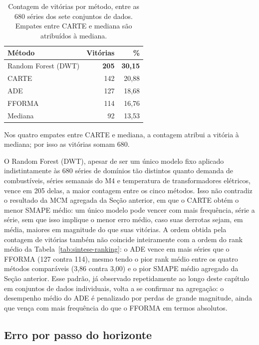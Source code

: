 \begin{table}[H]
\centering
\caption[Contagem de vitórias por método.]{Contagem de vitórias por método, entre as 680 séries dos sete conjuntos de dados. Empates entre CARTE e mediana são atribuídos à mediana.}
\label{tab:sintese-vitorias}
\begin{tabular}{@{}lrr@{}}
\toprule
\textbf{Método} & \textbf{Vitórias} & \textbf{\%} \\
\midrule
Random Forest (DWT) & \textbf{205} & \textbf{30,15} \\
CARTE               & 142 & 20,88 \\
ADE                 & 127 & 18,68 \\
FFORMA              & 114 & 16,76 \\
Mediana             & 92  & 13,53 \\
\bottomrule
\end{tabular}
\end{table}

Nos quatro empates entre CARTE e mediana, a contagem atribui a vitória à mediana; por isso as vitórias somam 680.

O Random Forest (DWT), apesar de ser um único modelo fixo aplicado indistintamente às 680 séries de domínios tão distintos quanto demanda de combustíveis, séries semanais do M4 e temperatura de transformadores elétricos, vence em 205 delas, a maior contagem entre os cinco métodos. Isso não contradiz o resultado da MCM agregada da Seção anterior, em que o CARTE obtém o menor SMAPE médio: um único modelo pode vencer com mais frequência, série a série, sem que isso implique o menor erro médio, caso suas derrotas sejam, em média, maiores em magnitude do que suas vitórias. A ordem obtida pela contagem de vitórias também não coincide inteiramente com a ordem do rank médio da Tabela~\ref{tab:sintese-ranking}: o ADE vence em mais séries que o FFORMA (127 contra 114), mesmo tendo o pior rank médio entre os quatro métodos comparáveis (3,86 contra 3,00) e o pior SMAPE médio agregado da Seção anterior. Esse padrão, já observado repetidamente ao longo deste capítulo em conjuntos de dados individuais, volta a se confirmar na agregação: o desempenho médio do ADE é penalizado por perdas de grande magnitude, ainda que vença com mais frequência do que o FFORMA em termos absolutos.

\subsection{Erro por passo do horizonte}


